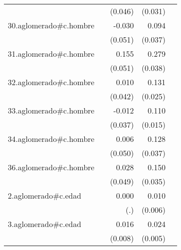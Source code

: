 {\begin{longtable}{l*{4}{D{.}{.}{-1}}}
            &                     &     (0.046)         &     (0.031)         &                     \\
\addlinespace
30.aglomerado#c.hombre&                     &      -0.030         &       0.094\sym{*}  &                     \\
            &                     &     (0.051)         &     (0.037)         &                     \\
\addlinespace
31.aglomerado#c.hombre&                     &       0.155\sym{**} &       0.279\sym{***}&                     \\
            &                     &     (0.051)         &     (0.038)         &                     \\
\addlinespace
32.aglomerado#c.hombre&                     &       0.010         &       0.131\sym{***}&                     \\
            &                     &     (0.042)         &     (0.025)         &                     \\
\addlinespace
33.aglomerado#c.hombre&                     &      -0.012         &       0.110\sym{***}&                     \\
            &                     &     (0.037)         &     (0.015)         &                     \\
\addlinespace
34.aglomerado#c.hombre&                     &       0.006         &       0.128\sym{***}&                     \\
            &                     &     (0.050)         &     (0.037)         &                     \\
\addlinespace
36.aglomerado#c.hombre&                     &       0.028         &       0.150\sym{***}&                     \\
            &                     &     (0.049)         &     (0.035)         &                     \\
\addlinespace
2.aglomerado#c.edad&                     &       0.000         &       0.010         &                     \\
            &                     &         (.)         &     (0.006)         &                     \\
\addlinespace
3.aglomerado#c.edad&                     &       0.016         &       0.024\sym{***}&                     \\
            &                     &     (0.008)         &     (0.005)         &                     \\

\end{longtable}}
